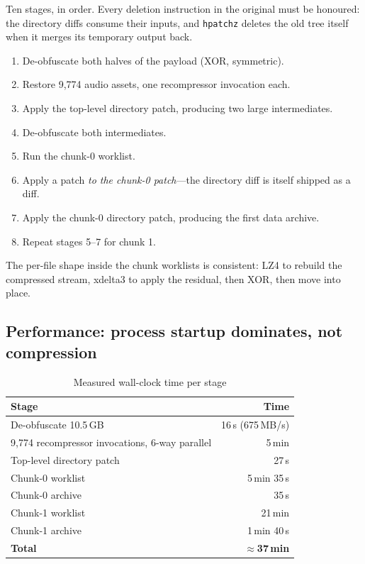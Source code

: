 Ten stages, in order. Every deletion instruction in the original must be honoured:
the directory diffs consume their inputs, and \verb|hpatchz| deletes the old tree
itself when it merges its temporary output back.

\begin{enumerate}
\item De-obfuscate both halves of the payload (XOR, symmetric).
\item Restore 9{,}774 audio assets, one recompressor invocation each.
\item Apply the top-level directory patch, producing two large intermediates.
\item De-obfuscate both intermediates.
\item Run the chunk-0 worklist.
\item Apply a patch \emph{to the chunk-0 patch}---the directory diff is itself
      shipped as a diff.
\item Apply the chunk-0 directory patch, producing the first data archive.
\item[8--10.] Repeat stages 5--7 for chunk 1.
\end{enumerate}

The per-file shape inside the chunk worklists is consistent: LZ4 to rebuild the
compressed stream, xdelta3 to apply the residual, then XOR, then move into place.

\subsection{Performance: process startup dominates, not compression}

\begin{table}[htbp]
\caption{Measured wall-clock time per stage}
\label{tab:timing}
\centering
\footnotesize
\begin{tabular}{@{}lr@{}}
\toprule
\textbf{Stage} & \textbf{Time} \\
\midrule
De-obfuscate 10.5\,GB & 16\,s (675\,MB/s) \\
9{,}774 recompressor invocations, 6-way parallel & 5\,min \\
Top-level directory patch & 27\,s \\
Chunk-0 worklist & 5\,min 35\,s \\
Chunk-0 archive & 35\,s \\
Chunk-1 worklist & 21\,min \\
Chunk-1 archive & 1\,min 40\,s \\
\midrule
\textbf{Total} & \textbf{$\approx$37\,min} \\
\bottomrule
\end{tabular}
\end{table}

